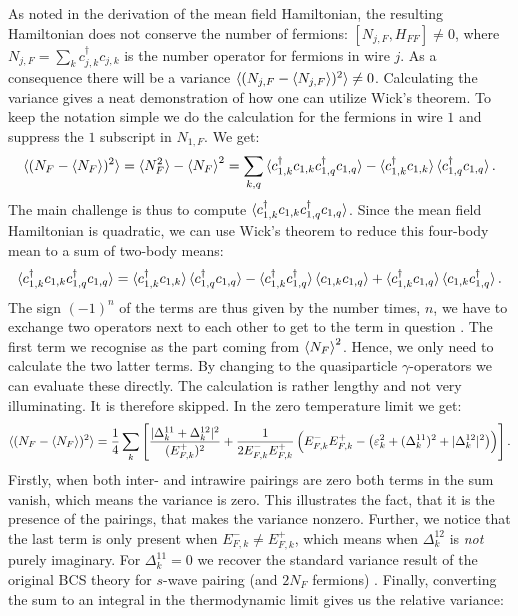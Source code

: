 As noted in the derivation of the mean field Hamiltonian, the resulting Hamiltonian does not conserve the number of fermions: $[N_{j,F}, H_{FF}] \neq 0 $, where $N_{j,F} = \sum_k c^\dagger_{j,k} c_{j,k}$ is the number operator for fermions in wire $j$. As a consequence there will be a variance $\braket{(N_{j,F}-\braket{N_{j,F}})^2} \neq 0$. Calculating the variance gives a neat demonstration of how one can utilize Wick's theorem. To keep the notation simple we do the calculation for the fermions in wire $1$ and suppress the $1$ subscript in $N_{1,F}$. We get:
\begin{equation}
\braket{(N_F - {\braket{N_F}})^2} = \braket{N_F^2} - \braket{N_F}^2 = \sum_{k,q} \braket{c^\dagger_{1,k}c_{1,k}c^\dagger_{1,q}c_{1,q}} - \braket{c^\dagger_{1,k}c_{1,k}}\braket{c^\dagger_{1,q}c_{1,q}}. \nonumber
\end{equation} 
The main challenge is thus to compute $\braket{c^\dagger_{1,k}c_{1,k}c^\dagger_{1,q}c_{1,q}}$. Since the mean field Hamiltonian is quadratic, we can use Wick's theorem to reduce this four-body mean to a sum of two-body means:
\begin{equation}
\braket{c^\dagger_{1,k}c_{1,k}c^\dagger_{1,q}c_{1,q}} = \braket{c^\dagger_{1,k}c_{1,k}}\braket{c^\dagger_{1,q}c_{1,q}} - \braket{c^\dagger_{1,k}c^\dagger_{1,q}}\braket{c_{1,k}c_{1,q}} + \braket{c^\dagger_{1,k}c_{1,q}}\braket{c_{1,k}c^\dagger_{1,q}}. \nonumber
\end{equation}
The sign $(-1)^{n}$ of the terms are thus given by the number times, $n$, we have to exchange two operators next to each other to get to the term in question \cite[pp. 198-202]{BruusFlensberg}. The first term we recognise as the part coming from $\braket{N_F}^2$. Hence, we only need to calculate the two latter terms. By changing to the quasiparticle $\gamma$-operators we can evaluate these directly. The calculation is rather lengthy and not very illuminating. It is therefore skipped. In the zero temperature limit we get:
\begin{equation}
\braket{(N_F - {\braket{N_F}})^2} = \frac{1}{4}\sum_k\left[ \frac{|\Delta^{11}_k + \Delta^{12}_k|^2}{(E^{+}_{F,k})^2} + \frac{1}{2E^{-}_{F,k}E^{+}_{F,k}}\left(E^{-}_{F,k}E^{+}_{F,k} - \left(\varepsilon_k^2 + (\Delta^{11}_k)^2 + |\Delta^{12}_k|^2\right) \right) \right].
\end{equation}
Firstly, when both inter- and intrawire pairings are zero both terms in the sum vanish, which means the variance is zero. This illustrates the fact, that it is the presence of the pairings, that makes the variance nonzero. Further, we notice that the last term is only present when $E^{-}_{F,k} \neq E^{+}_{F,k}$, which means when $\Delta^{12}_k$ is \textit{not} purely imaginary. For $\Delta^{11}_k = 0$ we recover the standard variance result of the original BCS theory for $s$-wave pairing (and $2N_F$ fermions) \cite[pp. 50-52]{Tinkham}. Finally, converting the sum to an integral in the thermodynamic limit gives us the relative variance:
